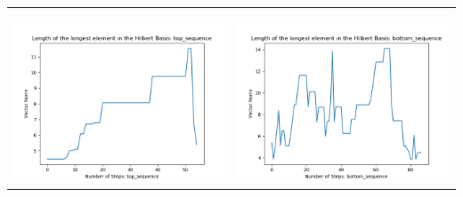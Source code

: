 \documentclass[10pt]{article}
\begin{document}
\begin{tabular}{c|c}
\begin{minipage}{.45\textwidth}
\end{minipage} \\ \\
\hline \\\begin{minipage}{.45\textwidth}
\includegraphics[width=\textwidth]{"DATA/4d/5 generators 2 bound H/top_sequence LENGTH"}
\end{minipage} &
\begin{minipage}{.45\textwidth}
\includegraphics[width=\textwidth]{"DATA/4d/5 generators 2 bound H bottomup/bottom_sequence LENGTH"}
\end{minipage}
\end{tabular}
\end{document}

